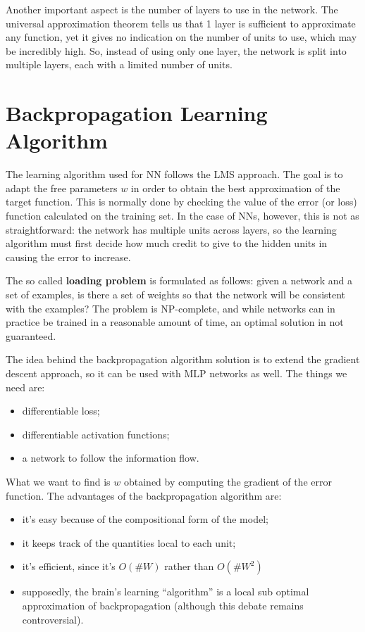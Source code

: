 Another important aspect is the number of layers to use in the network. The universal approximation theorem tells us that 1 layer is sufficient to approximate any function, yet it gives no indication on the number of units to use, which may be incredibly high. So, instead of using only one layer, the network is split into multiple layers, each with a limited number of units.

\section{Backpropagation Learning Algorithm}

The learning algorithm used for NN follows the LMS approach. The goal is to adapt the free parameters $w$ in order to obtain the best approximation of the target function. This is normally done by checking the value of the error (or loss) function calculated on the training set. In the case of NNs, however, this is not as straightforward: the network has multiple units across layers, so the learning algorithm must first decide how much credit to give to the hidden units in causing the error to increase.

The so called \textbf{loading problem} is formulated as follows: given a network and a set of examples, is there a set of weights so that the network will be consistent with the examples? The problem is NP-complete, and while networks can in practice be trained in a reasonable amount of time, an optimal solution in not guaranteed.

The idea behind the backpropagation algorithm solution is to extend the gradient descent approach, so it can be used with MLP networks as well. The things we need are:
\begin{itemize}
    \item differentiable loss;
    \item differentiable activation functions;
    \item a network to follow the information flow.
\end{itemize}
What we want to find is $w$ obtained by computing the gradient of the error function. The advantages of the backpropagation algorithm are:
\begin{itemize}
    \item it's easy because of the compositional form of the model;
    \item it keeps track of the quantities local to each unit;
    \item it's efficient, since it's $O(\#W)$ rather than $O(\#W^2)$
    \item supposedly, the brain's learning ``algorithm'' is a local sub optimal approximation of backpropagation (although this debate remains controversial).
\end{itemize}

